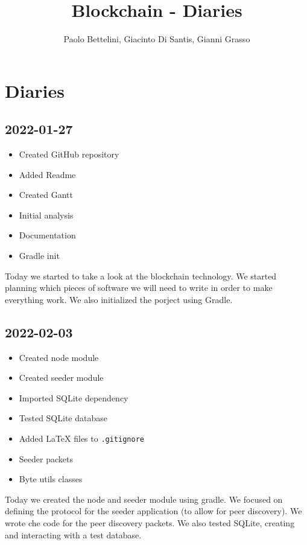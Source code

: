 \documentclass{article}
\title{Blockchain - Diaries}
\author{Paolo Bettelini, Giacinto Di Santis, Gianni Grasso}
\date{}
\begin{document}
\maketitle
\tableofcontents
\pagebreak

\section{Diaries}

\subsection*{2022-01-27}

\begin{itemize}
    \item Created GitHub repository
    \item Added Readme
    \item Created Gantt
    \item Initial analysis
    \item Documentation
    \item Gradle init
\end{itemize}

Today we started to take a look at the blockchain technology.
We started planning which pieces of software we will need to write in order
to make everything work. We also initialized the porject using Gradle.

\subsection*{2022-02-03}

\begin{itemize}
    \item Created node module
    \item Created seeder module
    \item Imported SQLite dependency
    \item Tested SQLite database
    \item Added LaTeX files to \texttt{.gitignore}
    \item Seeder packets
    \item Byte utils classes
\end{itemize}

Today we created the node and seeder module using gradle.
We focused on defining the protocol for the seeder application
(to allow for peer discovery). We wrote che code for the peer discovery
packets. We also tested SQLite, creating and interacting with a test database.
\end{document}
